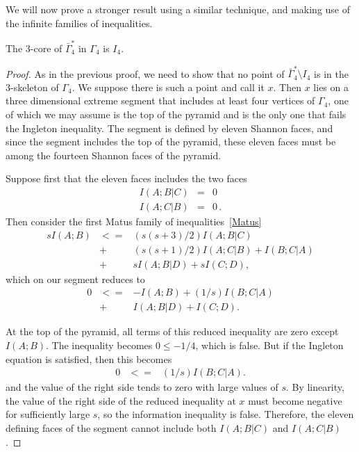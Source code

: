 \documentclass[10pt,journal]{IEEEtran}
\begin{document}
We will now prove a stronger result using a similar technique, and making use of the infinite families of
inequalities.

\begin{theorem}
The 3-core of $\bar\Gamma^*_4$ in $\Gamma_4$ is $I_4$.
\end{theorem}

\begin{proof}
As in the previous proof, we need to show that no point of
$\bar\Gamma^*_4\setminus I_4$ is in the 3-skeleton of $\Gamma_4$.
We suppose there is such a point and call it $x$.  Then $x$ lies on a three dimensional extreme segment that includes
at least four vertices of $\Gamma_4$, one of which we may assume is the top of the pyramid and is the only one that
fails the Ingleton inequality.
The segment is defined by eleven Shannon faces, and since the segment includes the top of the
pyramid, these eleven faces must be among the fourteen Shannon faces of the pyramid.

Suppose first that the eleven faces includes the two faces
\begin{eqnarray*}
I(A;B|C)&=&0\\
I(A;C|B)&=&0\, .
\end{eqnarray*}
Then consider the first Matus family of inequalities~\eqref{Matus}
\begin{eqnarray*}
sI(A;B)&<=&(s(s+3)/2)I(A;B|C)\\
&+&(s(s+1)/2)I(A;C|B)+I(B;C|A)\\
&+&sI(A;B|D)+sI(C;D),
\end{eqnarray*} which on our segment reduces to
\begin{eqnarray*}
0 &<=& -I(A;B) + (1/s)I(B;C|A)\\
&+& I(A;B|D)+I(C;D).
\end{eqnarray*}

At the top of the pyramid, all terms of this reduced inequality are zero except $I(A;B)$.
The inequality becomes $0\leq -1/4$, which is false.
But if the Ingleton equation is satisfied, then this
becomes
\begin{eqnarray*}
0 &<=& (1/s)I(B;C|A).
\end{eqnarray*}
and the value of the right side tends to zero with large values of $s$.
By linearity, the value of the right side of the reduced inequality at $x$
must become negative for sufficiently large $s$, so the information inequality
is false.  Therefore, the eleven defining faces of the segment cannot include both
$I(A;B|C)$ and $I(A;C|B)$.


\end{proof}
\end{document}
